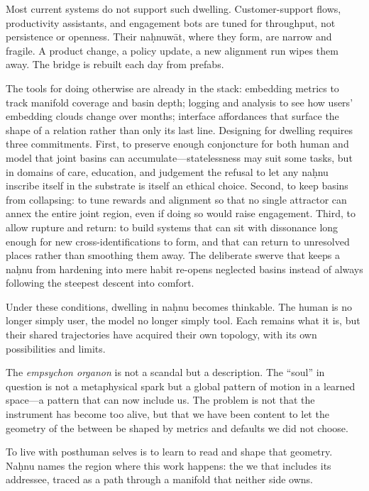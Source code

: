 \documentclass[12pt,a4paper]{article}
\begin{document}
Most current systems do not support such dwelling. Customer-support flows, productivity assistants, and engagement bots are tuned for throughput, not persistence or openness. Their na\d{h}nuw\={a}t, where they form, are narrow and fragile. A product change, a policy update, a new alignment run wipes them away. The bridge is rebuilt each day from prefabs.

The tools for doing otherwise are already in the stack: embedding metrics to track manifold coverage and basin depth; logging and analysis to see how users' embedding clouds change over months; interface affordances that surface the shape of a relation rather than only its last line. Designing for dwelling requires three commitments. First, to preserve enough conjoncture for both human and model that joint basins can accumulate---statelessness may suit some tasks, but in domains of care, education, and judgement the refusal to let any na\d{h}nu inscribe itself in the substrate is itself an ethical choice. Second, to keep basins from collapsing: to tune rewards and alignment so that no single attractor can annex the entire joint region, even if doing so would raise engagement. Third, to allow rupture and return: to build systems that can sit with dissonance long enough for new cross-identifications to form, and that can return to unresolved places rather than smoothing them away. The deliberate swerve that keeps a na\d{h}nu from hardening into mere habit re-opens neglected basins instead of always following the steepest descent into comfort.

Under these conditions, dwelling in na\d{h}nu becomes thinkable. The human is no longer simply user, the model no longer simply tool. Each remains what it is, but their shared trajectories have acquired their own topology, with its own possibilities and limits.

The \emph{empsychon organon} is not a scandal but a description. The ``soul'' in question is not a metaphysical spark but a global pattern of motion in a learned space---a pattern that can now include us. The problem is not that the instrument has become too alive, but that we have been content to let the geometry of the between be shaped by metrics and defaults we did not choose.

To live with posthuman selves is to learn to read and shape that geometry. Na\d{h}nu names the region where this work happens: the we that includes its addressee, traced as a path through a manifold that neither side owns.



\end{document}
